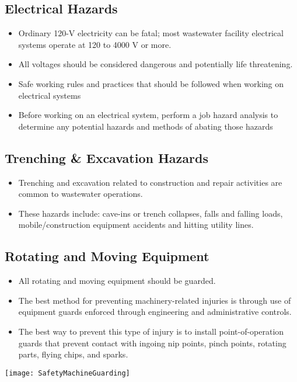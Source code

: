 \subsection{Electrical Hazards}
\begin{itemize}
\item Ordinary 120-V electricity can be fatal; most wastewater facility electrical systems operate at 120 to 4000 V or more.  
\item All voltages should be considered dangerous and potentially life threatening.  
\item Safe working rules and practices that should be followed when working on electrical systems
\item Before working on an electrical system, perform a job hazard analysis to determine any potential hazards and methods of abating those hazards
\end{itemize}

\subsection{Trenching \& Excavation Hazards}
\begin{itemize}
\item Trenching and excavation related to construction and repair activities are common to wastewater operations.  
\item These hazards include: cave-ins or trench collapses, falls and falling loads, mobile/construction equipment accidents and hitting utility lines.
\end{itemize}

\subsection{Rotating and Moving Equipment}

\begin{itemize}
\item All rotating and moving equipment should be guarded. 
\item The best method for preventing machinery-related injuries is through use of equipment guards enforced through engineering and administrative controls.   
\item The best way to prevent this type of injury is to install point-of-operation guards that prevent contact with ingoing nip points, pinch points, rotating parts, flying chips, and sparks.
\end{itemize}
\begin{center}
\texttt{[image: SafetyMachineGuarding]}\\
\end{center}

